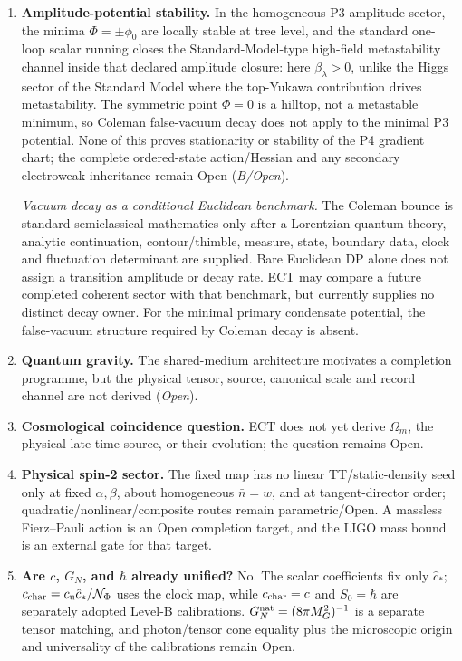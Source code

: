 \documentclass[11pt,a4paper]{article}
\begin{document}
\begin{enumerate}
\item \textbf{Amplitude-potential stability.} In the homogeneous P3 amplitude sector, the minima $\Phi=\pm\phi_0$ are locally stable at tree level, and the standard one-loop scalar running closes the Standard-Model-type high-field metastability channel inside that declared amplitude closure: here $\beta_\lambda>0$, unlike the Higgs sector of the Standard Model where the top-Yukawa contribution drives metastability. The symmetric point $\Phi=0$ is a hilltop, not a metastable minimum, so Coleman false-vacuum decay does not apply to the minimal P3 potential. None of this proves stationarity or stability of the P4 gradient chart; the complete ordered-state action/Hessian and any secondary electroweak inheritance remain Open (\emph{B/Open}).

\emph{Vacuum decay as a conditional Euclidean benchmark.} The Coleman bounce is standard semiclassical mathematics only after a Lorentzian quantum theory, analytic continuation, contour/thimble, measure, state, boundary data, clock and fluctuation determinant are supplied.  Bare Euclidean DP alone does not assign a transition amplitude or decay rate.  ECT may compare a future completed coherent sector with that benchmark, but currently supplies no distinct decay owner.  For the minimal primary condensate potential, the false-vacuum structure required by Coleman decay is absent.

\item \textbf{Quantum gravity.} The shared-medium architecture motivates a completion programme, but the physical tensor, source, canonical scale and record channel are not derived (\emph{Open}).

\item \textbf{Cosmological coincidence question.} ECT does not yet derive $\Omega_m$, the physical late-time source, or their evolution; the question remains Open.

\item \textbf{Physical spin-2 sector.} The fixed map has no linear TT/static-density seed only at fixed $\alpha,\beta$, about homogeneous $\bar n=w$, and at tangent-director order; quadratic/nonlinear/composite routes remain parametric/Open.  A massless Fierz--Pauli action is an Open completion target, and the LIGO mass bound is an external gate for that target.


\item \textbf{Are $c$, $G_N$, and $\hbar$ already unified?} No.  The scalar coefficients fix only $\hat c_*$; $c_{\rm char}=c_{\rm u}\hat c_*/\mathcal N_\Phi$ uses the clock map, while $c_{\rm char}=c$ and $S_0=\hbar$ are separately adopted Level-B calibrations.  $G_N^{\rm nat}=(8\pi M_G^2)^{-1}$ is a separate tensor matching, and photon/tensor cone equality plus the microscopic origin and universality of the calibrations remain Open.


\end{enumerate}
\end{document}
